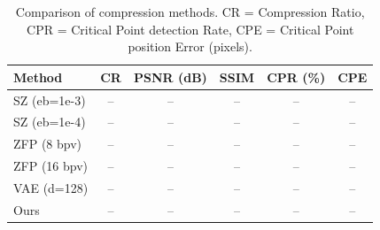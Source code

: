 \begin{table}[h]
\centering
\caption{Comparison of compression methods. CR = Compression Ratio, CPR = Critical Point detection Rate, CPE = Critical Point position Error (pixels).}
\label{tab:baseline-comparison}
\begin{tabular}{lccccc}
\toprule
Method & CR & PSNR (dB) & SSIM & CPR (\%) & CPE \\
\midrule
SZ (eb=1e-3) & -- & -- & -- & -- & -- \\
SZ (eb=1e-4) & -- & -- & -- & -- & -- \\
ZFP (8 bpv) & -- & -- & -- & -- & -- \\
ZFP (16 bpv) & -- & -- & -- & -- & -- \\
VAE (d=128) & -- & -- & -- & -- & -- \\
\midrule
Ours & -- & -- & -- & -- & -- \\
\bottomrule
\end{tabular}
\end{table}
